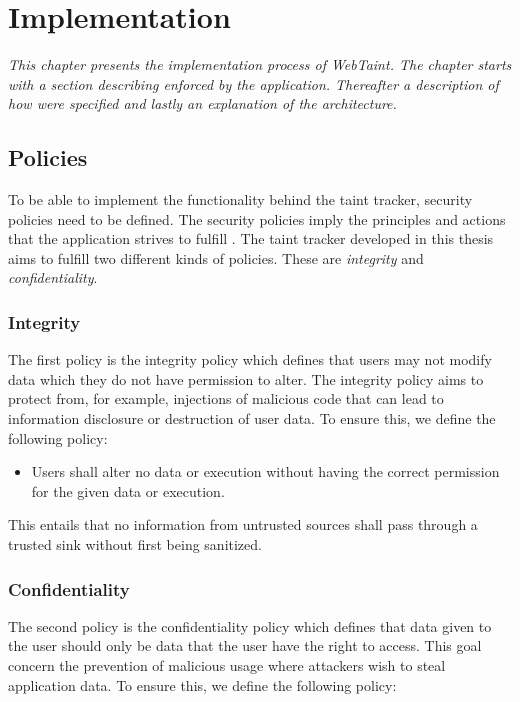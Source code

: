 \chapter{Implementation}
\label{Implementation}
\textit{This chapter presents the implementation process of WebTaint. The chapter starts with a section describing \textit{} enforced by the application. Thereafter a description of how  \textit{} were specified and lastly an explanation of the  \textit{} architecture.}



\section{Policies}
\label{Policies}
To be able to implement the functionality behind the taint tracker, security policies need to be defined. The security policies imply the principles and actions that the application strives to fulfill \parencite{BayukJenniferL2012Cspg}. The taint tracker developed in this thesis aims to fulfill two different kinds of policies. These are \textit{integrity} and \textit{confidentiality}.



\subsection{Integrity}
\label{Integrity}
The first policy is the integrity policy which defines that users may not modify data which they do not have permission to alter. The integrity policy aims to protect from, for example, injections of malicious code that can lead to information disclosure or destruction of user data. To ensure this, we define the following policy:

\hfill
\begin{itemize}
    \item Users shall alter no data or execution without having the correct permission for the given data or execution.
\end{itemize}
\hfill

This entails that no information from untrusted sources shall pass through a trusted sink without first being sanitized.



\subsection{Confidentiality}
\label{Confidentiality}
The second policy is the confidentiality policy which defines that data given to the user should only be data that the user have the right to access. This goal concern the prevention of malicious usage where attackers wish to steal application data. To ensure this, we define the following policy:

